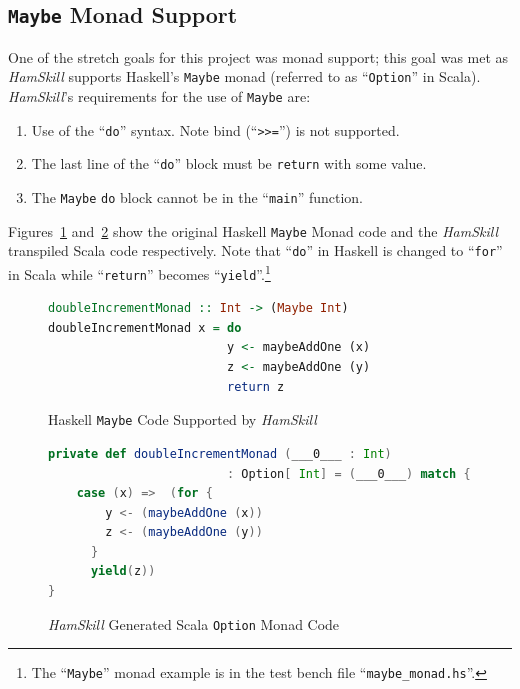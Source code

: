 \documentclass{report}
\begin{document}
\subsection{\texttt{Maybe} Monad Support}

One of the stretch goals for this project was monad support; this goal was met as \textit{HamSkill} supports Haskell's \texttt{Maybe} monad (referred to as ``\texttt{Option}'' in Scala).  \textit{HamSkill}'s requirements for the use of \texttt{Maybe} are:

\begin{enumerate}

\item Use of the ``\texttt{do}'' syntax.  Note bind (``\texttt{>{}>=}'') is not supported.

\item The last line of the ``\texttt{do}'' block must be \texttt{return} with some value.

\item The \texttt{Maybe} \texttt{do} block cannot be in the ``\texttt{main}'' function.

\end{enumerate}

Figures~\ref{fig:haskellMaybeMonad} and~\ref{fig:haskellOptionMonad} show the original Haskell \texttt{Maybe} Monad code and the \textit{HamSkill} transpiled Scala code respectively.  Note that ``\texttt{do}'' in Haskell is changed to ``\texttt{for}'' in Scala while ``\texttt{return}'' becomes ``\texttt{yield}''.\footnote{The ``\texttt{Maybe}'' monad example is in the test bench file ``\texttt{maybe\_monad.hs}''.}

\begin{figure}[H]
\begin{mdframed}
\begin{lstlisting}[language=Haskell]
doubleIncrementMonad :: Int -> (Maybe Int)
doubleIncrementMonad x = do
                         y <- maybeAddOne (x)
                         z <- maybeAddOne (y)
                         return z
\end{lstlisting}
\end{mdframed}
\caption{Haskell \texttt{Maybe} Code Supported by \textit{HamSkill}}
\label{fig:haskellMaybeMonad}
\end{figure}

\begin{figure}[H]
\begin{mdframed}
\begin{lstlisting}[language=Scala, basicstyle=\small]
private def doubleIncrementMonad (___0___ : Int) 
                         : Option[ Int] = (___0___) match {
    case (x) =>  (for {
        y <- (maybeAddOne (x))
        z <- (maybeAddOne (y))
      }
      yield(z))
}
\end{lstlisting}
\end{mdframed}
\caption{\textit{HamSkill} Generated Scala \texttt{Option} Monad Code}
\label{fig:haskellOptionMonad}
\end{figure}
\end{document}
